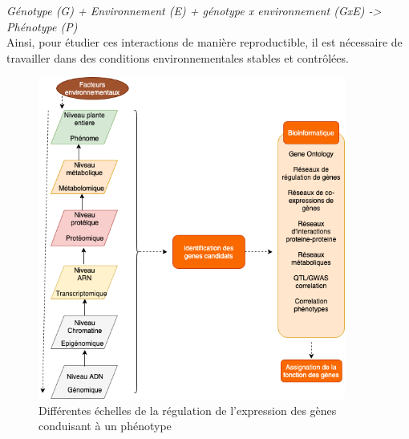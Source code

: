 \textit{Génotype (G) + Environnement (E) +  génotype x environnement (GxE) -> Phénotype (P)}\\
 
 Ainsi, pour étudier ces interactions de manière reproductible, il est nécessaire de travailler dans des conditions environnementales stables et contrôlées. 
 \\
 
\begin{figure}[!ht]
    \centering
    \includegraphics[width=0.9\textwidth]{hdr_manuscript/Figures/multi-echelles.png}
    \caption{Différentes échelles de la régulation de l’expression  des gènes conduisant à un phénotype \cite{ChenCAK14}}
    \label{fig:geno-pheno}
\end{figure}

